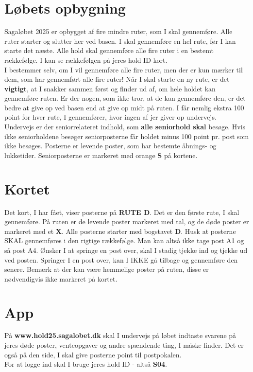 \section{Løbets opbygning}
Sagaløbet 2025 er opbygget af fire mindre ruter, som I skal gennemføre. Alle ruter starter og slutter her ved basen. I skal gennemføre en hel rute, før I kan starte det næste. Alle hold skal gennemføre alle fire ruter i en bestemt rækkefølge. I kan se rækkefølgen på jeres hold ID-kort.\\\newline
I bestemmer selv, om I vil gennemføre alle fire ruter, men der er kun mærker til dem, som har gennemført alle fire ruter! Når I skal starte en ny rute, er det \textbf{vigtigt}, at I snakker sammen først og finder ud af, om hele holdet kan gennemføre ruten. Er der nogen, som ikke tror, at de kan gennemføre den, er det bedre at give op ved basen end at give op midt på ruten. I får nemlig ekstra 100 point for hver rute, I gennemfører, hvor ingen af jer giver op undervejs.\\
\newline
Undervejs er der seniorrelateret indhold, som \textbf{alle seniorhold skal} besøge. Hvis ikke seniorholdene besøger seniorposterne får holdet minus 100 point pr. post som ikke besøges. Posterne er levende poster, som har bestemte åbnings- og lukketider. Seniorposterne er markeret med orange \textbf{S} på kortene.\\
\newline
\section{Kortet}
Det kort, I har fået, viser posterne på \textbf{RUTE D}. Det er den første rute, I skal gennemføre. På ruten er de levende poster markeret med tal, og de døde poster er markeret med et \textbf{X}. Alle posterne starter med bogstavet \textbf{D}. Husk at posterne SKAL gennemføres i den rigtige rækkefølge. Man kan altså ikke tage post A1 og så post A4. Ønsker I at springe en post over, skal I stadig tjekke ind og tjekke ud ved posten. Springer I en post over, kan I IKKE gå tilbage og gennemføre den senere. Bemærk at der kan være hemmelige poster på ruten, disse er nødvendigvis ikke markeret på kortet.
\section{App}
På \textbf{www.hold25.sagalobet.dk} skal I undervejs på løbet indtaste svarene på jeres døde poster, venteopgaver og andre spændende ting, I måske finder. Det er også på den side, I skal give posterne point til postpokalen.\\
For at logge ind skal I bruge jeres hold ID - altså \textbf{S04}.
\newpage
